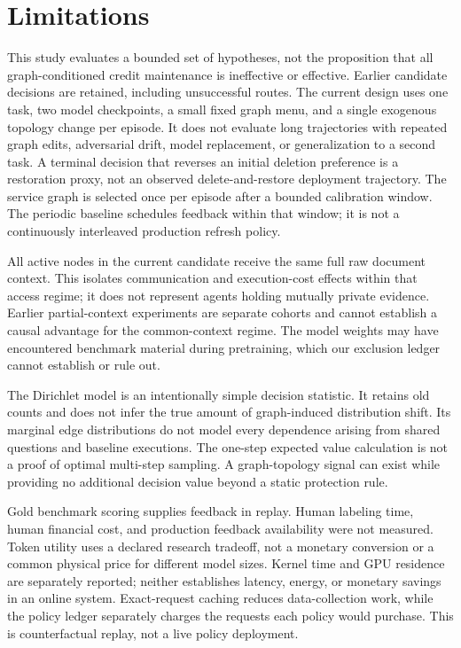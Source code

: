 \section*{Limitations}
This study evaluates a bounded set of hypotheses, not the proposition that
all graph-conditioned credit maintenance is ineffective or effective.
Earlier candidate decisions are retained, including unsuccessful routes.
The current design uses one task, two model checkpoints, a small fixed
graph menu, and a single exogenous topology change per episode. It does not
evaluate long trajectories with repeated graph edits, adversarial drift,
model replacement, or generalization to a second task. A terminal decision
that reverses an initial deletion preference is a restoration proxy, not
an observed delete-and-restore deployment trajectory.
The service graph is selected once per episode after a bounded calibration
window. The periodic baseline schedules feedback within that window; it
is not a continuously interleaved production refresh policy.

All active nodes in the current candidate receive the same full raw
document context. This isolates communication and execution-cost effects
within that access regime; it does not represent agents holding mutually
private evidence. Earlier partial-context experiments are separate cohorts
and cannot establish a causal advantage for the common-context regime.
The model weights may have encountered benchmark material during
pretraining, which our exclusion ledger cannot establish or rule out.

The Dirichlet model is an intentionally simple decision statistic. It
retains old counts and does not infer the true amount of graph-induced
distribution shift. Its marginal edge distributions do not model every
dependence arising from shared questions and baseline executions. The
one-step expected value calculation is not a proof of optimal multi-step
sampling. A graph-topology signal can exist while providing no additional
decision value beyond a static protection rule.

Gold benchmark scoring supplies feedback in replay. Human labeling time,
human financial cost, and production feedback availability were not
measured. Token utility uses a declared research tradeoff, not a monetary
conversion or a common physical price for different model sizes. Kernel
time and GPU residence are separately reported; neither establishes
latency, energy, or monetary savings in an online system. Exact-request
caching reduces data-collection work, while the policy ledger separately
charges the requests each policy would purchase. This is counterfactual
replay, not a live policy deployment.

